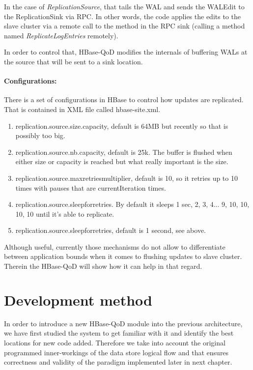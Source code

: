 In the case of \emph{ReplicationSource}, that tails the WAL and sends the WALEdit to the ReplicationSink via RPC. In other words, the code applies the edits to the slave cluster via a remote call to the method in the RPC sink (calling a method named \emph{ReplicateLogEntries} remotely).

In order to control that, HBase-QoD modifies the internals of buffering WALs at the source that will be sent to a sink location.

\paragraph*{Configurations:}
There is a set of configurations in HBase to control how updates are replicated. That is contained in XML file called hbase-site.xml.

\begin{enumerate}
\item replication.source.size.capacity, default is 64MB but recently so that is possibly too big.
\item replication.source.nb.capacity, default is 25k. The buffer is flushed when either size or capacity is reached but what really important is the size.
\item replication.source.maxretriesmultiplier, default is 10, so it retries up to 10 times with pauses that are currentIteration times.
\item replication.source.sleepforretries. By default it sleeps 1 sec, 2, 3, 4... 9, 10, 10, 10, 10 until it's able to replicate.
\item replication.source.sleepforretries, default is 1 second, see above.
\end{enumerate}

Although useful, currently those mechanisms do not allow to differentiate between application bounds when it comes to flushing updates to slave cluster. Therein the HBase-QoD will show how it can help in that regard.

\section{Development method}\label{method}
In order to introduce a new HBase-QoD module into the previous architecture, we have first studied the system to get familiar with it and identify the best locations for new code added. Therefore we take into account the original programmed inner-workings of the data store logical flow and that ensures correctness and validity of the paradigm implemented later in next chapter. 

